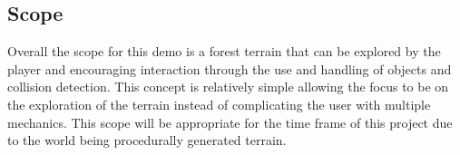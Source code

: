 \documentclass{scrartcl}
\begin{document}
\subsection{Scope}
Overall the scope for this demo is a forest terrain that can be explored by the player and encouraging interaction through the use and handling of objects and collision detection. This concept is relatively simple allowing the focus to be on the exploration of the terrain instead of complicating the user with multiple mechanics. This scope will be appropriate for the time frame of this project due to the world being procedurally generated terrain.
\end{document}
